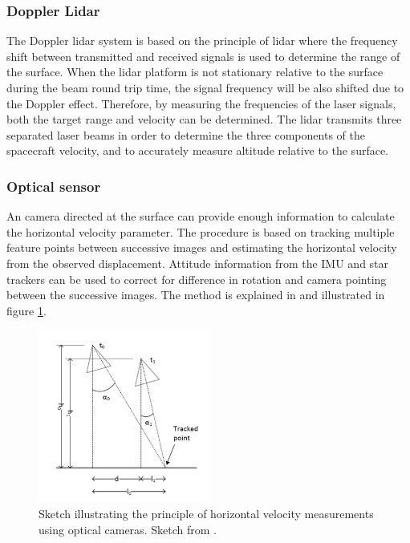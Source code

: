 \subsubsection{Doppler Lidar}

The Doppler lidar system is based on the principle of lidar where the frequency shift between transmitted and received signals is used to determine the range of the surface. When the lidar platform is not stationary relative to the surface during the  beam round trip time, the signal frequency will be also shifted due to the Doppler effect. Therefore, by measuring the frequencies of the laser signals, both the target range and velocity can be
determined. The lidar transmits three separated laser beams in order to determine the three components of the spacecraft velocity, and to accurately measure altitude relative to the surface. 
 

  
\subsubsection{Optical sensor}
An camera directed at the surface can provide enough information to calculate the horizontal velocity parameter. The procedure is based on tracking multiple feature points between successive images and estimating the horizontal velocity from the observed displacement. Attitude information from the IMU and star trackers can be used to correct for difference in rotation and camera pointing between the successive images. The method is explained in \cite{alessandro} and illustrated in figure \ref{horvel}.

\begin{figure}[htb]
\begin{center}
\includegraphics[width=0.5\textwidth]{figures/navtheory/horvel}
\caption{Sketch illustrating the principle of horizontal velocity measurements using optical cameras. Sketch from \cite{alessandro}.}
\label{horvel}
\end{center}
\end{figure}


